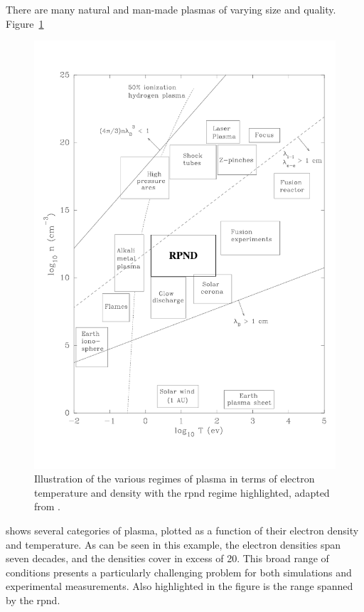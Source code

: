 There are many natural and man-made plasmas of varying size and quality.
Figure~\ref{fig:regimes}
\begin{figure}
  \centering
  \includegraphics{./chapters/theory/figures/regimes.pdf}
  \caption{Illustration of the various regimes of plasma in terms of
    electron temperature and density with the \acs{rpnd} regime highlighted,
    adapted from \cite{Huba2011}.}
  \label{fig:regimes}
\end{figure}
shows several categories of plasma, plotted as a function of their electron
density and temperature. As can be seen in this example, the electron densities
span seven decades, and the densities cover in excess of 20. This broad range of
conditions presents a particularly challenging problem for both simulations and
experimental measurements. Also highlighted in the figure is the range spanned
by the \acs{rpnd}.

